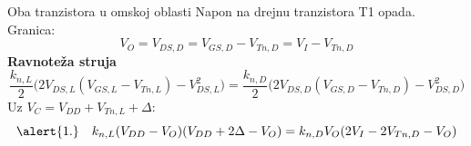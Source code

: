 \begin{frame}[label=09_1-s043]{Oba tranzistora u omskoj oblasti}\setlength{\parskip}{2pt}\setlength{\abovedisplayskip}{4pt}\setlength{\belowdisplayskip}{4pt}\setlength{\abovedisplayshortskip}{3pt}\setlength{\belowdisplayshortskip}{3pt}
Napon na drejnu tranzistora T1 opada. Granica:\[V_O=V_{DS,D}=V_{GS,D}-V_{Tn,D}=V_I-V_{Tn,D}\]
\textbf{Ravnoteža struja}\[\frac{k_{n,L}}2\bigl(2V_{DS,L}(V_{GS,L}-V_{Tn,L})-V_{DS,L}^2\bigr)=\frac{k_{n,D}}2\bigl(2V_{DS,D}(V_{GS,D}-V_{Tn,D})-V_{DS,D}^2\bigr)\]
Uz $V_C=V_{DD}+V_{Tn,L}+\Delta$:\[\alert{1.}\quad k_{n,L}(V_{DD}-V_O)(V_{DD}+2\Delta-V_O)=k_{n,D}V_O(2V_I-2V_{Tn,D}-V_O)\]

\end{frame}
